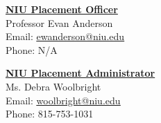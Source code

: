\documentclass[final]{article}
\begin{document}
	\begin{minipage}{.5\textwidth}
		\textbf{\underline{NIU Placement Officer}} \\
		Professor Evan Anderson \\
		Email: \underline{\href{mailto:ewanderson@niu.edu}{ewanderson@niu.edu}}\\
		Phone: N/A \\
	\end{minipage}
	\begin{minipage}{.5\textwidth}
		\textbf{\underline{NIU Placement Administrator}} \\
		Ms. Debra Woolbright \\
		Email: \underline{\href{mailto:woolbright@niu.edu}{woolbright@niu.edu}} \\
		Phone: 815-753-1031 \\
	\end{minipage}
\end{document}
